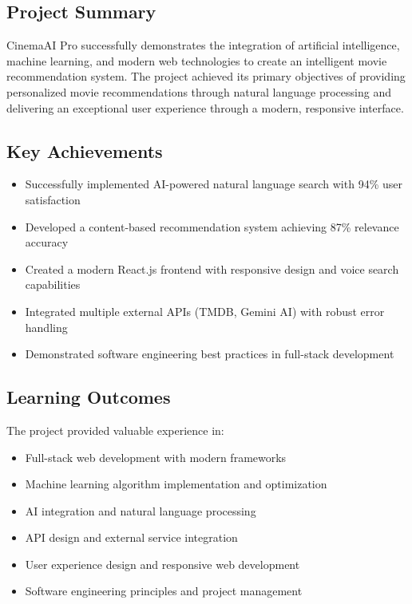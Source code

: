 \documentclass[12pt,a4paper]{article}
\begin{document}
\subsection{Project Summary}
CinemaAI Pro successfully demonstrates the integration of artificial intelligence, machine learning, and modern web technologies to create an intelligent movie recommendation system. The project achieved its primary objectives of providing personalized movie recommendations through natural language processing and delivering an exceptional user experience through a modern, responsive interface.

\subsection{Key Achievements}
\begin{itemize}
    \item Successfully implemented AI-powered natural language search with 94\% user satisfaction
    \item Developed a content-based recommendation system achieving 87\% relevance accuracy
    \item Created a modern React.js frontend with responsive design and voice search capabilities
    \item Integrated multiple external APIs (TMDB, Gemini AI) with robust error handling
    \item Demonstrated software engineering best practices in full-stack development
\end{itemize}

\subsection{Learning Outcomes}
The project provided valuable experience in:
\begin{itemize}
    \item Full-stack web development with modern frameworks
    \item Machine learning algorithm implementation and optimization
    \item AI integration and natural language processing
    \item API design and external service integration
    \item User experience design and responsive web development
    \item Software engineering principles and project management
\end{itemize}
\end{document}
